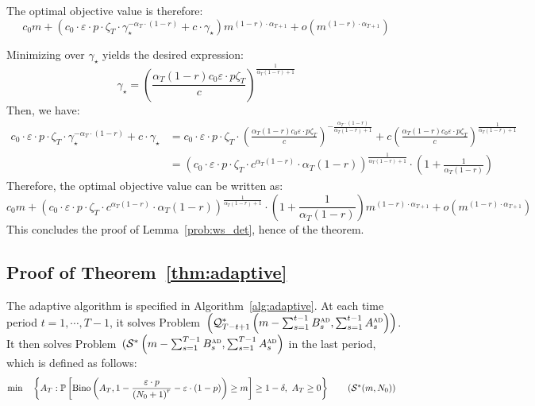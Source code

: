 \documentclass[nonblindrev]{informs3noheader}
\DeclareMathOperator\Bino{Bino}
\def\P{\mathbb{P}}
\def\calQ{\mathcal{Q}}
\def\calS{\mathcal{S}}
\begin{document}
The optimal objective value is therefore:
$$c_0m+\left(c_0\cdot\varepsilon\cdot p\cdot\zeta_T\cdot \gamma_\star^{-\alpha_T\cdot(1-r)}+c\cdot\gamma_\star\right)m^{(1-r)\cdot\alpha_{T+1}}+ o\left(m^{(1-r)\cdot\alpha_{T+1}}\right)$$

Minimizing over $\gamma_\star$ yields the desired expression:
$$\gamma_\star=\left(\frac{\alpha_T(1-r)c_0\varepsilon\cdot p \zeta_T}{c}\right)^{\frac{1}{\alpha_T(1-r)+1}}$$
Then, we have:
\begin{align*}
	c_0\cdot\varepsilon\cdot p\cdot\zeta_T\cdot \gamma_\star^{-\alpha_T\cdot(1-r)}+c\cdot\gamma_\star
	&= c_0\cdot\varepsilon\cdot p\cdot\zeta_T\cdot \left(\frac{\alpha_T(1-r)c_0\varepsilon\cdot p \zeta_T}{c}\right)^{-\frac{\alpha_T\cdot(1-r)}{\alpha_T(1-r)+1}}+c\left(\frac{\alpha_T(1-r)c_0\varepsilon\cdot p \zeta_T}{c}\right)^{\frac{1}{\alpha_T(1-r)+1}}\\
	&= \left(c_0\cdot\varepsilon\cdot p\cdot\zeta_T\cdot c^{\alpha_T(1-r)}\cdot\alpha_T(1-r)\right)^{\frac{1}{\alpha_T(1-r)+1}}\cdot \left(1+\frac{1}{\alpha_T(1-r)}\right)
\end{align*}
Therefore, the optimal objective value can be written as:
$$c_0m+\left(c_0\cdot\varepsilon\cdot p\cdot\zeta_T\cdot c^{\alpha_T(1-r)}\cdot\alpha_T(1-r)\right)^{\frac{1}{\alpha_T(1-r)+1}}\cdot \left(1+\frac{1}{\alpha_T(1-r)}\right)m^{(1-r)\cdot\alpha_{T+1}}+ o\left(m^{(1-r)\cdot\alpha_{T+1}}\right)$$
This concludes the proof of Lemma~\ref{prob:ws_det}, hence of the theorem.
\hfill\Halmos

\subsection{Proof of Theorem~\ref{thm:adaptive}}

The adaptive algorithm is specified in Algorithm~\ref{alg:adaptive}. At each time period $t=1,\cdots,T-1$, it solves Problem~$\left(\calQ^*_{T-t+1}\left(m-\sum_{s=1}^{t-1}B^{\textsc{ad}}_s,\sum_{s=1}^{t-1} A^{\textsc{ad}}_s\right)\right)$. It then solves Problem~$(\calS^*\left(m-\sum_{s=1}^{T-1}B^{\textsc{ad}}_s,\sum_{s=1}^{T-1} A^{\textsc{ad}}_s\right)$ in the last period, which is defined as follows:
\begin{align}
    \min\quad &\left\{A_T:\P\left[\Bino\left(A_T, 1- \frac{\varepsilon\cdot p}{\left(N_0 +1\right)^r}-\varepsilon\cdot(1-p) \right)\geq m\right] \geq 1-\delta,\ A_T\geq0\right\} \label{prob:lastperiod}\tag{$\calS^*(m,N_0)$}
\end{align}
\end{document}
